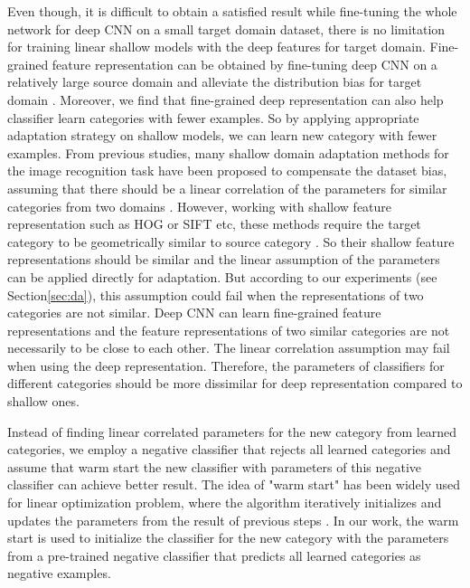 Even though, it is difficult to obtain a satisfied result while fine-tuning the whole network for deep CNN on a small target domain dataset, there is no limitation for training linear shallow models with the deep features for target domain. Fine-grained feature representation can be obtained by fine-tuning deep CNN on a relatively large source domain and alleviate the distribution bias for target domain \cite{zhang2014part}. Moreover, we find that fine-grained deep representation can also help classifier learn categories with fewer examples.
So by applying appropriate adaptation strategy on shallow models, we can learn new category with fewer examples. From previous studies, many shallow domain adaptation methods for the image recognition task have been proposed to compensate the dataset bias, assuming that there should be a linear correlation of the parameters for similar categories from two domains \cite{daume2009frustratingly} \cite{yang2007adapting} \cite{aytar2011tabula}.
However, working with shallow feature representation such as HOG or SIFT etc, these methods require the target category to be geometrically similar to source category \cite{aytar2011tabula}. So their shallow feature representations should be similar and the linear assumption of the parameters can be applied directly for adaptation. But according to our experiments (see Section\ref{sec:da}), this assumption could fail when the representations of two categories are not similar.
Deep CNN can learn fine-grained feature representations and the feature representations of two similar categories are not necessarily to be close to each other. The linear correlation assumption may fail when using the deep representation. Therefore, the parameters of classifiers for different categories should be more dissimilar for deep representation compared to shallow ones.

Instead of finding linear correlated parameters for the new category from learned categories, we employ a negative classifier that rejects all learned categories and assume that warm start the new classifier with parameters of this negative classifier can achieve better result. The idea of "warm start" has been widely used for linear optimization problem, where the algorithm iteratively initializes and updates the parameters from the result of previous steps \cite{yildirim2002warm} \cite{john2008implementation} \cite{zeilinger2011real} \cite{chuwarm}. In our work, the warm start is used to initialize the classifier for the new category with the parameters from a pre-trained negative classifier that predicts all learned categories as negative examples.

